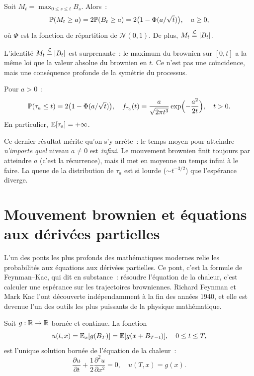\begin{corollaire}
\label{cor:loi_max}
Soit $M_t = \max_{0 \leq s \leq t} B_s$. Alors~:
\[
  \mathbb{P}(M_t \geq a) = 2\mathbb{P}(B_t \geq a) = 2\bigl(1 - \Phi(a/\sqrt{t})\bigr),
  \quad a \geq 0,
\]
o\`u $\Phi$ est la fonction de r\'epartition de $\mathcal{N}(0,1)$.
De plus, $M_t \overset{\mathcal{L}}{=} \left| B_t \right|$.
\end{corollaire}

L'identit\'e $M_t \overset{\mathcal{L}}{=} \left| B_t \right|$ est surprenante~: le
maximum du brownien sur $[0, t]$ a la m\^eme loi que la valeur absolue du
brownien en $t$. Ce n'est pas une co\"incidence, mais une cons\'equence
profonde de la sym\'etrie du processus.

\begin{corollaire}
Pour $a > 0$~:
\[
  \mathbb{P}(\tau_a \leq t) = 2\bigl(1 - \Phi(a/\sqrt{t})\bigr), \quad
  f_{\tau_a}(t) = \frac{a}{\sqrt{2\pi t^3}} \exp\Bigl(-\frac{a^2}{2t}\Bigr),
  \quad t > 0.
\]
En particulier, $\mathbb{E}[\tau_a] = +\infty$.
\end{corollaire}

Ce dernier r\'esultat m\'erite qu'on s'y arr\^ete~: le temps moyen pour
atteindre \emph{n'importe quel} niveau $a \neq 0$ est \emph{infini}. Le
mouvement brownien finit toujours par atteindre $a$ (c'est la r\'ecurrence),
mais il met en moyenne un temps infini \`a le faire. La queue de la
distribution de $\tau_a$ est si lourde ($\sim t^{-3/2}$) que l'esp\'erance
diverge.

\section{Mouvement brownien et \'equations aux d\'eriv\'ees partielles}

L'un des ponts les plus profonds des math\'ematiques modernes relie les
probabilit\'es aux \'equations aux d\'eriv\'ees partielles. Ce pont, c'est la
formule de Feynman--Kac, qui dit en substance~: r\'esoudre l'\'equation de la
chaleur, c'est calculer une esp\'erance sur les trajectoires browniennes.
Richard Feynman et Mark Kac l'ont d\'ecouverte ind\'ependamment \`a la fin des
ann\'ees 1940, et elle est devenue l'un des outils les plus puissants de
la physique math\'ematique.

\begin{theoreme}
\label{thm:feynman_kac}
Soit $g : \mathbb{R} \to \mathbb{R}$ born\'ee et continue. La fonction
\[
  u(t, x) = \mathbb{E}_x[g(B_T)] = \mathbb{E}[g(x + B_{T-t})], \quad 0 \leq t \leq T,
\]
est l'unique solution born\'ee de l'\'equation de la chaleur~:
\[
  \frac{\partial u}{\partial t} + \frac{1}{2} \frac{\partial^2 u}{\partial x^2} = 0,
  \quad u(T, x) = g(x).
\]
\end{theoreme}

